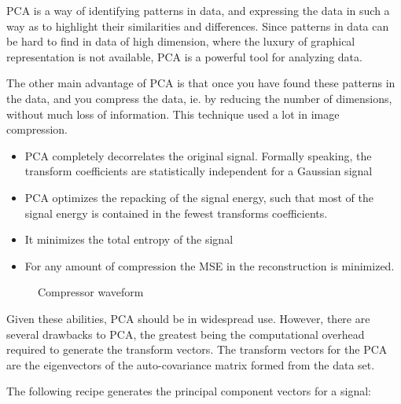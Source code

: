 \documentclass[paper=letter, fontsize=11pt, onecolunm, twoside]{scrartcl}
\begin{document}

\ac{PCA} is a way of identifying patterns in data, and expressing the
data in such a way as to highlight their similarities and differences.
Since patterns in data can be hard to find in data of high dimension,
where the luxury of graphical representation is not available,
\ac{PCA} is a powerful tool for analyzing data.

The other main advantage of PCA is that once you have found these
patterns in the data, and you compress the data, ie. by reducing the
number of dimensions, without much loss of information. This technique
used a lot in image compression.

\begin{itemize}
 \item \ac{PCA} completely decorrelates the original signal. Formally
 speaking, the transform coefficients are statistically independent
 for a Gaussian signal
 \item \ac{PCA} optimizes the repacking of the signal energy, such
 that most of the signal energy is contained in the fewest transforms
 coefficients.
 \item It minimizes the total entropy of the signal
 \item For any amount of compression the \ac{MSE} in the
 reconstruction is minimized.
\end{itemize}

\begin{figure}
\caption{Compressor waveform}
\label{fig:compressor-waveform}
\end{figure}


Given these abilities, \ac{PCA} should be in widespread use. However,
there are several drawbacks to \ac{PCA}, the greatest being the
computational overhead required to generate the transform vectors. The
transform vectors for the \ac{PCA} are the eigenvectors of the
auto-covariance matrix formed from the data set. 

The following recipe generates the principal component vectors for a
signal:
\end{document}
